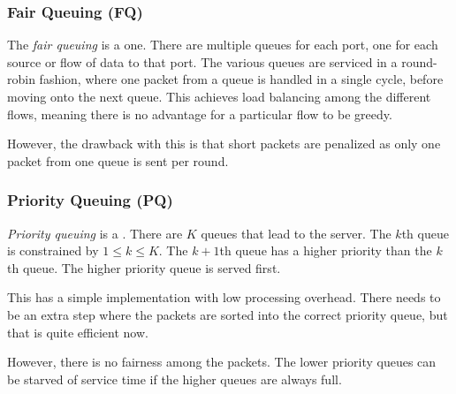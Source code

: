 \subsubsection{Fair Queuing (FQ)}\label{subsubsec:Fair_Queuing}
\begin{definition}\label{def:Fair_Queuing}
  The \emph{fair queuing}  is a  one.
  There are multiple queues for each port, one for each source or flow of data to that port.
  The various queues are serviced in a round-robin fashion, where one packet from a queue is handled in a single cycle, before moving onto the next queue.
  This achieves load balancing among the different flows, meaning there is no advantage for a particular flow to be greedy.

  However, the drawback with this is that short packets are penalized as only one packet from one queue is sent per round.
\end{definition}

\subsubsection{Priority Queuing (PQ)}\label{subsubsec:Priority_Queuing}
\begin{definition}\label{def:Priority_Queuing}
  \emph{Priority queuing} is a  .
  There are $K$ queues that lead to the server.
  The $k$th queue is constrained by $1 \leq k \leq K$.
  The $k+1$th queue has a higher priority than the $k$th queue.
  The higher priority queue is served first.

  This has a simple implementation with low processing overhead.
  There needs to be an extra step where the packets are sorted into the correct priority queue, but that is quite efficient now.

  However, there is no fairness among the packets.
  The lower priority queues can be starved of service time if the higher queues are always full.
\end{definition}

